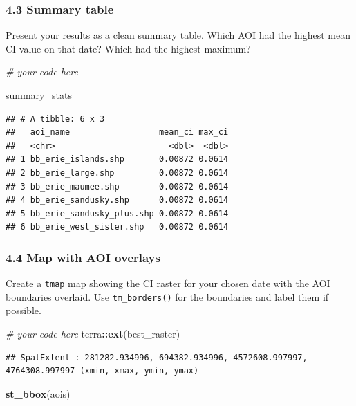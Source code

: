 \documentclass[
]{article}
\newenvironment{Shaded}{\begin{snugshade}}{\end{snugshade}}
\newcommand{\CommentTok}[1]{\textcolor[rgb]{0.56,0.35,0.01}{\textit{#1}}}
\newcommand{\FunctionTok}[1]{\textcolor[rgb]{0.13,0.29,0.53}{\textbf{#1}}}
\newcommand{\NormalTok}[1]{#1}
\newcommand{\SpecialCharTok}[1]{\textcolor[rgb]{0.81,0.36,0.00}{\textbf{#1}}}
\begin{document}
\hypertarget{summary-table}{%
\subsubsection{4.3 Summary table}\label{summary-table}}

Present your results as a clean summary table. Which AOI had the highest
mean CI value on that date? Which had the highest maximum?

\begin{Shaded}
\begin{Highlighting}[]
\CommentTok{\# your code here}

\NormalTok{summary\_stats}
\end{Highlighting}
\end{Shaded}

\begin{verbatim}
## # A tibble: 6 x 3
##   aoi_name                  mean_ci max_ci
##   <chr>                       <dbl>  <dbl>
## 1 bb_erie_islands.shp       0.00872 0.0614
## 2 bb_erie_large.shp         0.00872 0.0614
## 3 bb_erie_maumee.shp        0.00872 0.0614
## 4 bb_erie_sandusky.shp      0.00872 0.0614
## 5 bb_erie_sandusky_plus.shp 0.00872 0.0614
## 6 bb_erie_west_sister.shp   0.00872 0.0614
\end{verbatim}

\hypertarget{map-with-aoi-overlays}{%
\subsubsection{4.4 Map with AOI overlays}\label{map-with-aoi-overlays}}

Create a \texttt{tmap} map showing the CI raster for your chosen date
with the AOI boundaries overlaid. Use \texttt{tm\_borders()} for the
boundaries and label them if possible.

\begin{Shaded}
\begin{Highlighting}[]
\CommentTok{\# your code here}
\NormalTok{terra}\SpecialCharTok{::}\FunctionTok{ext}\NormalTok{(best\_raster)}
\end{Highlighting}
\end{Shaded}

\begin{verbatim}
## SpatExtent : 281282.934996, 694382.934996, 4572608.997997, 4764308.997997 (xmin, xmax, ymin, ymax)
\end{verbatim}

\begin{Shaded}
\begin{Highlighting}[]
\FunctionTok{st\_bbox}\NormalTok{(aois)}
\end{Highlighting}
\end{Shaded}
\end{document}
